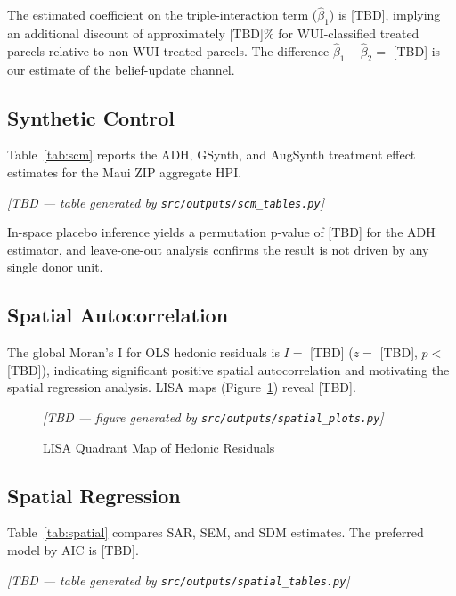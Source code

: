\documentclass[12pt]{article}
\begin{document}
The estimated coefficient on the triple-interaction term ($\hat\beta_1$) is
[TBD], implying an additional discount of approximately [TBD]\% for WUI-classified
treated parcels relative to non-WUI treated parcels. The difference
$\hat\beta_1 - \hat\beta_2 = $ [TBD] is our estimate of the belief-update channel.

\subsection{Synthetic Control}

Table~\ref{tab:scm} reports the ADH, GSynth, and AugSynth treatment effect
estimates for the Maui ZIP aggregate HPI.

\begin{table}[H]
\caption{Synthetic Control Treatment Effects}
\label{tab:scm}
\centering
% 
\textit{[TBD --- table generated by \texttt{src/outputs/scm\_tables.py}]}
\end{table}

In-space placebo inference yields a permutation p-value of [TBD] for the
ADH estimator, and leave-one-out analysis confirms the result is not driven
by any single donor unit.

\subsection{Spatial Autocorrelation}

The global Moran's I for OLS hedonic residuals is $I = $ [TBD]
($z = $ [TBD], $p < $ [TBD]), indicating significant positive spatial
autocorrelation and motivating the spatial regression analysis. LISA maps
(Figure~\ref{fig:lisa}) reveal [TBD].

\begin{figure}[H]
\centering
\textit{[TBD --- figure generated by \texttt{src/outputs/spatial\_plots.py}]}
\caption{LISA Quadrant Map of Hedonic Residuals}
\label{fig:lisa}
\end{figure}

\subsection{Spatial Regression}

Table~\ref{tab:spatial} compares SAR, SEM, and SDM estimates. The preferred
model by AIC is [TBD].

\begin{table}[H]
\caption{Spatial Regression: SAR, SEM, and SDM}
\label{tab:spatial}
\centering
% 
\textit{[TBD --- table generated by \texttt{src/outputs/spatial\_tables.py}]}
\end{table}
\end{document}
